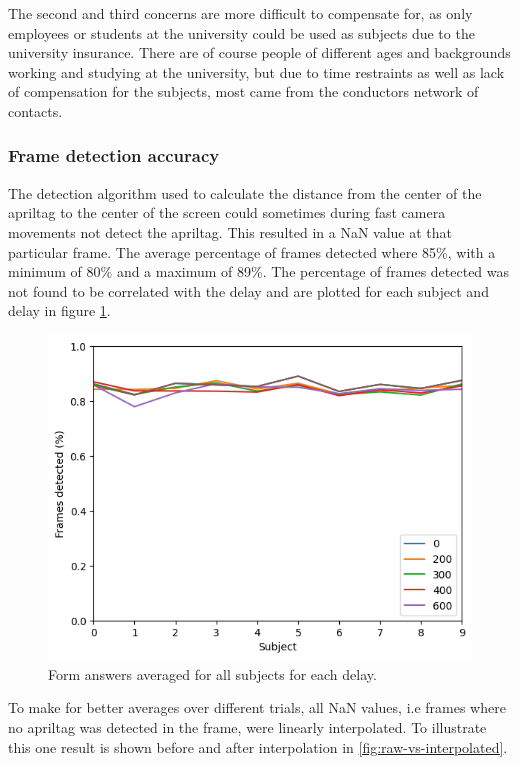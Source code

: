 \documentclass[nofilelist]{cslthse-msc}
\begin{document}
The second and third concerns are more difficult to compensate for, as only employees or students at the university could be used as subjects due to the university insurance. There are of course people of different ages and backgrounds working and studying at the university, but due to time restraints as well as lack of compensation for the subjects, most came from the conductors network of contacts.

\subsubsection{Frame detection accuracy}
The detection algorithm used to calculate the distance from the center of the apriltag to the center of the screen could sometimes during fast camera movements not detect the apriltag. This resulted in a NaN value at that particular frame. The average percentage of frames detected where 85\%, with a minimum of 80\% and a maximum of 89\%. The percentage of frames detected was not found to be correlated with the delay and are plotted for each subject and delay in figure \ref{fig:frames-detected}. 

\begin{figure}[!hbt]
   \centering
   \includegraphics[scale=0.5]{images/frames-detected.png} 
   \caption{Form answers averaged for all subjects for each delay.}
   \label{fig:frames-detected}
\end{figure}

To make for better averages over different trials, all NaN values, i.e frames where no apriltag was detected in the frame, were linearly interpolated. To illustrate this one result is shown before and after interpolation in \ref{fig:raw-vs-interpolated}. 
\end{document}
